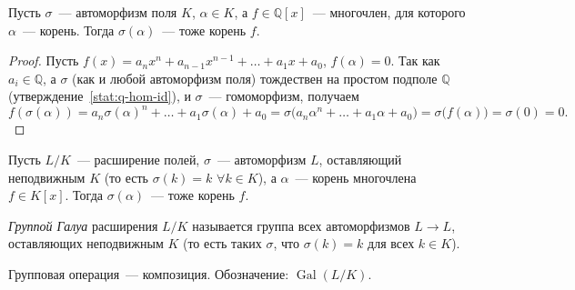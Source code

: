 \documentclass[12pt]{article}
\begin{document}
	\begin{theorem}\label{thm:aut-root}
		Пусть $\sigma$~--- автоморфизм поля $K$, $\alpha \in K$, а $f \in \mathbb{Q}[x]$~--- многочлен, для которого $\alpha$~--- корень. Тогда $\sigma(\alpha)$~--- тоже корень $f$.
	\end{theorem}
	\begin{proof}
		Пусть $f(x) = a_nx^n + a_{n-1}x^{n-1} + \dots + a_1x + a_0$, $f(\alpha)=0$. Так как $a_i \in \mathbb{Q}$, а $\sigma$ (как и любой автоморфизм поля) тождествен на простом подполе $\mathbb{Q}$ (утверждение~\ref{stat:q-hom-id}), и $\sigma$~--- гомоморфизм, получаем
		\[
			f(\sigma(\alpha)) = a_n\sigma(\alpha)^n + \dots + a_1\sigma(\alpha) + a_0 = \sigma\bigl(a_n\alpha^n + \dots + a_1\alpha + a_0\bigr) = \sigma\bigl(f(\alpha)\bigr) = \sigma(0) = 0.
		\]
	\end{proof}

	\begin{corollary}\label{cor:aut-root-relative}
		Пусть $L/K$~--- расширение полей, $\sigma$~--- автоморфизм $L$, оставляющий неподвижным $K$ (то есть $\sigma(k)=k$ $\forall k \in K$), а $\alpha$~--- корень многочлена $f \in K[x]$. Тогда $\sigma(\alpha)$~--- тоже корень $f$.
	\end{corollary}

	\begin{definition}\label{def:galois-group}
		\emph{Группой Галуа} расширения $L/K$ называется группа всех автоморфизмов $L \to L$, оставляющих неподвижным $K$ (то есть таких $\sigma$, что $\sigma(k)=k$ для всех $k \in K$).

		Групповая операция~--- композиция. Обозначение: $\operatorname{Gal}(L/K)$.
	\end{definition}
	
\end{document}
